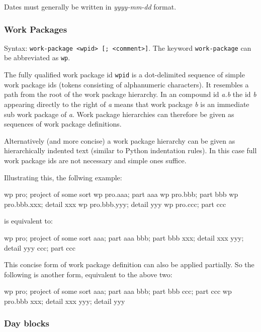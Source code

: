 \documentclass[11pt]{article}
\begin{document}
Dates must generally be written in \emph{yyyy-mm-dd} format.

\subsubsection{Work Packages}

Syntax: \verb:work-package <wpid> [; <comment>]:.
The keyword \verb:work-package: can be abbreviated as \verb:wp:.

The fully qualified work package id \verb:wpid: is a dot-delimited sequence of simple work package ids (tokens consisting of alphanumeric characters). It resembles a path from the root of the work package hierarchy. In an compound id \emph{a.b} the id \emph{b} appearing directly to the right of \emph{a} means that work package \emph{b} is an immediate sub work package of \emph{a}. Work package hierarchies can therefore be given as sequences of work package definitions.

Alternatively (and more concise) a work package hierarchy can be given as hierarchically indented text (similar to Python indentation rules). In this case full work package ids are not necessary and simple ones suffice.

Illustrating this, the follwing example:

\begin{inputfile}
wp pro; project of some sort
wp pro.aaa; part aaa
wp pro.bbb; part bbb
wp pro.bbb.xxx; detail xxx
wp pro.bbb.yyy; detail yyy
wp pro.ccc; part ccc
\end{inputfile}

is equivalent to:

\begin{inputfile}
wp pro; project of some sort
    aaa; part aaa
    bbb; part bbb
        xxx; detail xxx
        yyy; detail yyy
    ccc; part ccc
\end{inputfile}

This concise form of work package definition can also be applied partially. So the following is another form, equivalent to the above two:

\begin{inputfile}
wp pro; project of some sort
    aaa; part aaa
    bbb; part bbb
    ccc; part ccc
wp pro.bbb
    xxx; detail xxx
    yyy; detail yyy
\end{inputfile}

\subsubsection{Day blocks}
\end{document}
